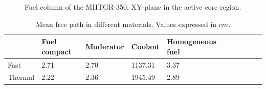 \documentclass[11pt,letterpaper]{article}
\begin{document}
\begin{figure}[htbp!]
	\centering
	\hfill
    \caption{Fuel column of the MHTGR-350. XY-plane in the active core region.}
	\label{fig:fuelcolumn}
\end{figure}

\begin{table}[htbp!]
  \centering
  \caption{Mean free path in different materials. Values expressed in $cm$.}
  \begin{tabular}{l|l|llllllll}
  \toprule
              & Fuel compact  & Moderator  & Coolant  & Homogeneous fuel \\
  \midrule
  Fast  		& 2.71 & 2.70 & 1137.31 & 3.37 \\
  Thermal		& 2.22 & 2.36 & 1945.49 & 2.89 \\

  \bottomrule
  \end{tabular}
  \label{tab:mfp}
\end{table}
\end{document}
